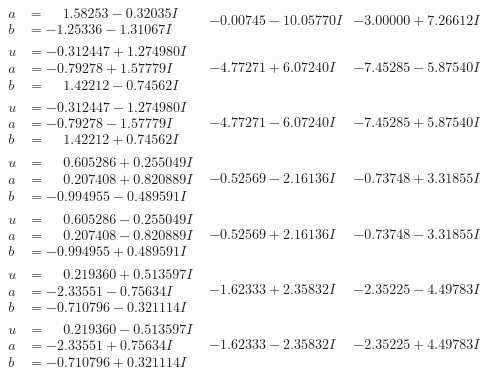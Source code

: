 \documentclass[1p]{elsarticle_modified}
\theoremstyle{definition}
\begin{document}
$$\begin{array}{c|c|c}
\begin{aligned}
a &= \phantom{-}1.58253 - 0.32035 I \\
b &= -1.25336 - 1.31067 I\end{aligned}
 & -0.00745 - 10.05770 I & -3.00000 + 7.26612 I \\ \hline\begin{aligned}
u &= -0.312447 + 1.274980 I \\
a &= -0.79278 + 1.57779 I \\
b &= \phantom{-}1.42212 - 0.74562 I\end{aligned}
 & -4.77271 + 6.07240 I & -7.45285 - 5.87540 I \\ \hline\begin{aligned}
u &= -0.312447 - 1.274980 I \\
a &= -0.79278 - 1.57779 I \\
b &= \phantom{-}1.42212 + 0.74562 I\end{aligned}
 & -4.77271 - 6.07240 I & -7.45285 + 5.87540 I \\ \hline\begin{aligned}
u &= \phantom{-}0.605286 + 0.255049 I \\
a &= \phantom{-}0.207408 + 0.820889 I \\
b &= -0.994955 - 0.489591 I\end{aligned}
 & -0.52569 - 2.16136 I & -0.73748 + 3.31855 I \\ \hline\begin{aligned}
u &= \phantom{-}0.605286 - 0.255049 I \\
a &= \phantom{-}0.207408 - 0.820889 I \\
b &= -0.994955 + 0.489591 I\end{aligned}
 & -0.52569 + 2.16136 I & -0.73748 - 3.31855 I \\ \hline\begin{aligned}
u &= \phantom{-}0.219360 + 0.513597 I \\
a &= -2.33551 - 0.75634 I \\
b &= -0.710796 - 0.321114 I\end{aligned}
 & -1.62333 + 2.35832 I & -2.35225 - 4.49783 I \\ \hline\begin{aligned}
u &= \phantom{-}0.219360 - 0.513597 I \\
a &= -2.33551 + 0.75634 I \\
b &= -0.710796 + 0.321114 I\end{aligned}
 & -1.62333 - 2.35832 I & -2.35225 + 4.49783 I \\ \hline\begin{aligned}

\end{aligned}
\end{array}$$
\end{document}
